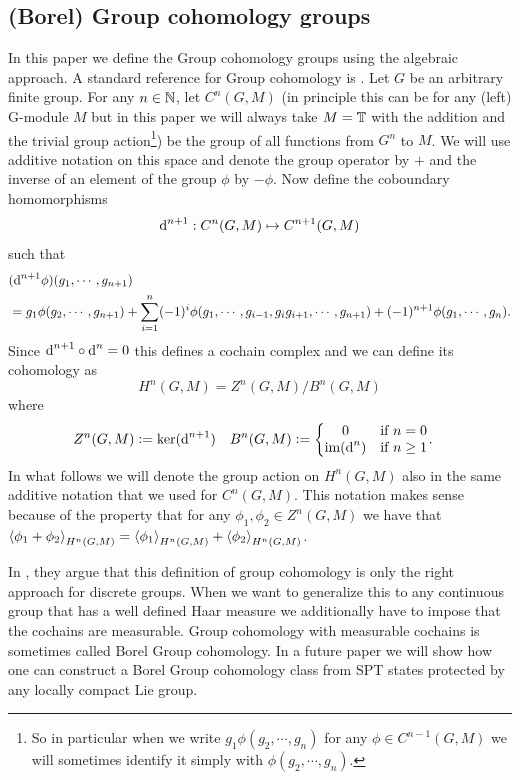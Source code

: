\documentclass[12pt,a4paper,twoside]{article}
\numberwithin{equation}{section}
\begin{document}
\subsection{(Borel) Group cohomology groups}\label{sec:GroupCohomology}
In this paper we define the Group cohomology groups using the algebraic approach. A standard reference for Group cohomology is \cite{benson1991representations}. Let $G$ be an arbitrary finite group. For any $n\in\mathbb{N}$, let $C^n(G,M)$ (in principle this can be for any (left) G-module $M$ but in this paper we will always take $M=\mathbb T$ with the addition and the trivial group action\footnote{So in particular when we write $g_1 \phi(g_2,\cdots,g_n)$ for any $\phi\in C^{n-1}(G,M)$ we will sometimes identify it simply with $\phi(g_2,\cdots,g_n)$.}) be the group of all functions from $G^n$ to $M$. We will use additive notation on this space and denote the group operator by $+$ and the inverse of an element of the group $\phi$ by $-\phi$. Now define the coboundary homomorphisms
\begin{equation}
	\text{d}^{n+1}:C^n(G,M)\mapsto C^{n+1}(G,M)
\end{equation}
such that
\begin{align}
	\nonumber
	&(\text{d}^{n+1}\phi)(g_1,\cdots,g_{n+1})\\
	&=g_1\phi(g_2,\cdots,g_{n+1})+\sum_{i=1}^n (-1)^i \phi(g_1,\cdots,g_{i-1},g_{i}g_{i+1},\cdots,g_{n+1})+(-1)^{n+1}\phi(g_1,\cdots,g_n).
\end{align}
Since $\text{d}^{n+1}\circ\text{d}^{n}=0$ this defines a cochain complex and we can define its cohomology as
\begin{equation}
	H^n(G,M)=Z^n(G,M)/B^n(G,M)
\end{equation}
where
\begin{align}
	Z^n(G,M)&\defeq \ker(\d^{n+1})&B^n(G,M)&\defeq \left\{\begin{matrix}
	0&\text{if }n=0\\\textrm{im}(\d^n)&\text{if }n\geq 1
	\end{matrix}\right. .
\end{align}
In what follows we will denote the group action on $H^n(G,M)$ also in the same additive notation that we used for $C^n(G,M)$. This notation makes sense because of the property that for any $\phi_1,\phi_2\in Z^n(G,M)$ we have that $\expval{\phi_1+\phi_2}_{H^n(G,M)}=\expval{\phi_1}_{H^n(G,M)}+\expval{\phi_2}_{H^n(G,M)}$.
\begin{remark}
	In \cite{Chen_2013}, they argue that this definition of group cohomology is only the right approach for discrete groups. When we want to generalize this to any continuous group that has a well defined Haar measure we additionally have to impose that the cochains are measurable. Group cohomology with measurable cochains is sometimes called Borel Group cohomology. In a future paper we will show how one can construct a Borel Group cohomology class from SPT states protected by any locally compact Lie group.
\end{remark}
\end{document}
